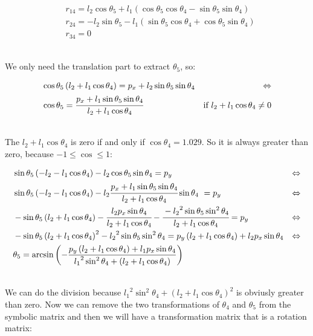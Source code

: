 \begin{small}
\begin{align*}
&r_{14} = l_2\cos\theta_5 + l_1\left(\cos\theta_5\cos\theta_4 - \sin\theta_5\sin\theta_4\right)\\
&r_{24} = -l_2\sin\theta_5 - l_1\left(\sin\theta_5\cos\theta_4 + \cos\theta_5\sin\theta_4\right)\\
&r_{34} = 0
\end{align*}
\end{small}\\
We only need the translation part to extract $\theta_5$, so:
\begin{small}
\begin{align*}
&\cos\theta_5\left(l_2+l_1\cos\theta_4\right) = p_x + l_2\sin\theta_5\sin\theta_4 & \Leftrightarrow\\
&\cos\theta_5 = \cfrac{p_x + l_1\sin\theta_5\sin\theta_4}{l_2+l_1\cos\theta_4}&\text{if }l_2+l_1\cos\theta_4\neq0\\
\end{align*}
\end{small}\\
The \(l_2+l_1\cos\theta_4\) is zero if and only if \(\cos\theta_4 = 1.029\). So it is always greater than zero, because \(-1 \leq \cos \leq 1\):
\begin{small}
\begin{align*}
&\sin\theta_5\left(-l_2-l_1\cos\theta_4\right) - l_2\cos\theta_5\sin\theta_4 = p_y& \Leftrightarrow\\
&\sin\theta_5\left(-l_2-l_1\cos\theta_4\right) - l_2\cfrac{p_x + l_1\sin\theta_5\sin\theta_4}{l_2+l_1\cos\theta_4}\sin\theta_4\ =p_y & \Leftrightarrow\\
&-\sin\theta_5\left(l_2+l_1\cos\theta_4\right) - \cfrac{l_2p_x\sin\theta_4}{l_2+l_1\cos\theta_4} - \cfrac{-{l_2}^2\sin\theta_5\sin^2\theta_4}{l_2+l_1\cos\theta_4} = p_y&\Leftrightarrow\\
&-\sin\theta_5\left(l_2+l_1\cos\theta_4\right)^2 - {l_2}^2\sin\theta_5\sin^2\theta_4 = p_y\left(l_2+l_1\cos\theta_4\right) + l_2p_x\sin\theta_4 & \Leftrightarrow\\
&\theta_5 = \arcsin\left(-\frac{p_y\left(l_2+l_1\cos\theta_4\right) + l_1p_x\sin\theta_4}{{l_1}^2\sin^2\theta_4 + \left(l_2 + l_1\cos\theta_4\right)}\right)
\end{align*}
\end{small}\\
We can do the division because ${l_1}^2\sin^2\theta_4 + \left(l_2 + l_1\cos\theta_4\right)^2$ is obviusly greater than zero. 
Now we can remove the two transformations of $\theta_4$ and $\theta_5$ from the symbolic matrix and then we will have a transformation matrix that is a rotation matrix:

